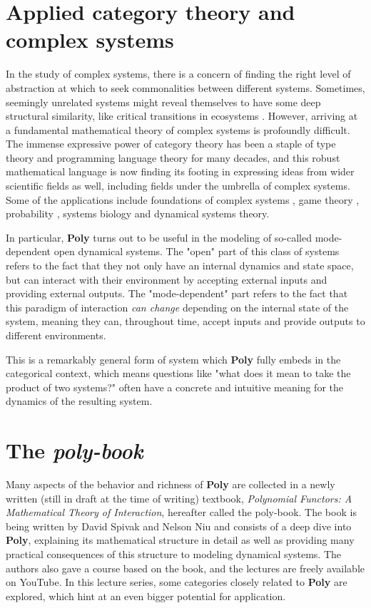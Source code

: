 \section{Applied category theory and complex systems}
In the study of complex systems, there is a concern of finding the right level of abstraction at which to seek commonalities between different systems. Sometimes, seemingly unrelated systems might reveal themselves to have some deep structural similarity, like critical transitions in ecosystems \cite{catastrophic}. However, arriving at a fundamental mathematical theory of complex systems is profoundly difficult. The immense expressive power of category theory has been a staple of type theory and programming language theory for many decades, and this robust mathematical language is now finding its footing in expressing ideas from wider scientific fields as well, including fields under the umbrella of complex systems. Some of the applications include foundations of complex systems \cite{complexcatsadjunction}, game theory \cite{compositional-gt}, probability \cite{markov-categories}, systems biology \cite{compositional-react-net} and dynamical systems theory\cite{operad-dynsys}.

In particular, \textbf{Poly} turns out to be useful in the modeling of so-called mode-dependent open dynamical systems. The "open" part of this class of systems refers to the fact that they not only have an internal dynamics and state space, but can interact with their environment by accepting external inputs and providing external outputs. The "mode-dependent" part refers to the fact that this paradigm of interaction \textit{can change} depending on the internal state of the system, meaning they can, throughout time, accept inputs and provide outputs to different environments.

This is a remarkably general form of system which \textbf{Poly} fully embeds in the categorical context, which means questions like "what does it mean to take the product of two systems?" often have a concrete and intuitive meaning for the dynamics of the resulting system.

\section{The \textit{poly-book}}
Many aspects of the behavior and richness of \textbf{Poly} are collected in a newly written (still in draft at the time of writing) textbook, \textit{Polynomial Functors: A Mathematical Theory of Interaction}, hereafter called the poly-book. The book is being written by David Spivak and Nelson Niu and consists of a deep dive into \textbf{Poly}, explaining its mathematical structure in detail as well as providing many practical consequences of this structure to modeling dynamical systems. The authors also gave a course based on the book, and the lectures are freely available on YouTube. In this lecture series, some categories closely related to \textbf{Poly} are explored, which hint at an even bigger potential for application.



